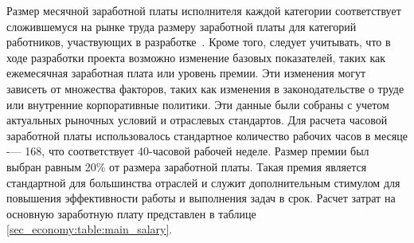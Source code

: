 Размер месячной заработной платы исполнителя каждой категории соответствует сложившемуся на рынке труда размеру заработной платы для категорий работников, участвующих в разработке~\cite{programmersalaries}.
Кроме того, следует учитывать, что в ходе разработки проекта возможно изменение базовых показателей, таких как ежемесячная заработная плата или уровень премии. Эти изменения могут зависеть от множества факторов, таких как изменения в законодательстве о труде или внутренние корпоративные политики.
Эти данные были собраны с учетом актуальных рыночных условий и отраслевых стандартов. Для расчета часовой заработной платы использовалось стандартное количество рабочих часов в месяце -— 168, что соответствует 40-часовой рабочей неделе. Размер премии был выбран равным 20\% от размера заработной платы. Такая премия является стандартной для большинства отраслей и служит дополнительным стимулом для повышения эффективности работы и выполнения задач в срок. Расчет затрат на основную заработную плату представлен в таблице \ref{sec_economy:table:main_salary}.





